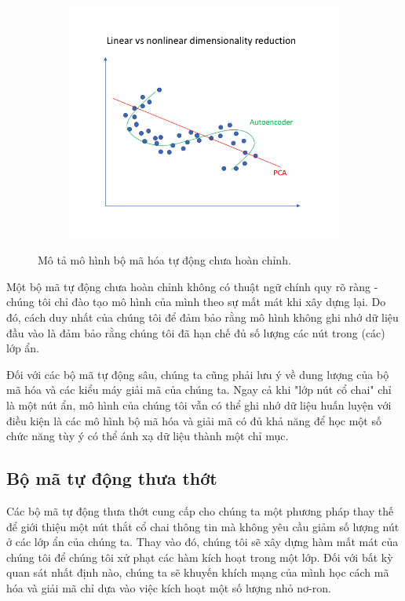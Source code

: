 \begin{figure}
    \begin{subfigure}{0.5\textwidth}
        \includegraphics[width=1.\linewidth]{Chapters/items/auto3.jpg}
        \caption{}
        \label{fig: auto3}
    \end{subfigure}
    \caption{Mô tả mô hình bộ mã hóa tự động chưa hoàn chỉnh.}
\end{figure}

Một bộ mã tự động chưa hoàn chỉnh không có thuật ngữ chính quy
rõ ràng - chúng tôi chỉ đào tạo mô hình của mình theo sự mất mát
khi xây dựng lại. Do đó, cách duy nhất của chúng tôi để đảm bảo rằng
mô hình không ghi nhớ dữ liệu đầu vào là đảm bảo rằng chúng tôi đã
hạn chế đủ số lượng các nút trong (các) lớp ẩn.

Đối với các bộ mã tự động sâu, chúng ta cũng phải lưu ý về dung
lượng của bộ mã hóa và các kiểu máy giải mã của chúng ta.
Ngay cả khi "lớp nút cổ chai" chỉ là một nút ẩn, mô hình của
chúng tôi vẫn có thể ghi nhớ dữ liệu huấn luyện với điều kiện là
các mô hình bộ mã hóa và giải mã có đủ khả năng để học một số chức
năng tùy ý có thể ánh xạ dữ liệu thành một chỉ mục.

\subsection{Bộ mã tự động thưa thớt}

Các bộ mã tự động thưa thớt cung cấp cho chúng ta một phương pháp
thay thế để giới thiệu một nút thắt cổ chai thông tin mà không
yêu cầu giảm số lượng nút ở các lớp ẩn của chúng ta. Thay vào đó,
chúng tôi sẽ xây dựng hàm mất mát của chúng tôi để chúng tôi
xử phạt các hàm kích hoạt trong một lớp. Đối với bất kỳ quan sát
nhất định nào, chúng ta sẽ khuyến khích mạng của mình học cách mã hóa và
giải mã chỉ dựa vào việc kích hoạt một số lượng nhỏ nơ-ron.

